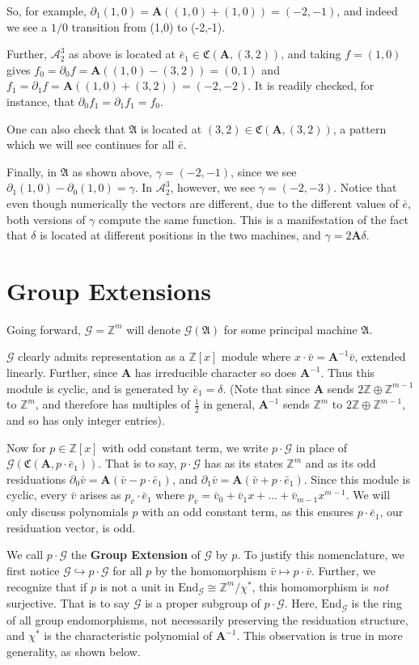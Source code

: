 \documentclass{article}
\newcommand{\A}{\mathcal{A}}
\newcommand{\G}{\mathcal{G}}
\renewcommand{\P}{\mathfrak{A}}
\newcommand{\Z}{\mathbb{Z}}
\newcommand{\2}{\textbf{2}}
\newcommand{\Am}{\textbf{A}}
\newcommand{\del}{\partial}
\newcommand{\vv}{\bar{v}}
\newcommand{\e}{\bar{e}}
\theoremstyle{definition}
\begin{document}
So, for example, $\del_1 (1,0) = \Am ((1,0) + (1,0)) = (-2,-1)$, and indeed
we see a $1/0$ transition from (1,0) to (-2,-1).

Further, $\A^3_2$ as above is located at 
$\e_1 \in \mathfrak{C}( \Am, (3,2) )$,
and taking $f = (1,0)$ gives 
$f_0 = \del_0 f = \Am((1,0) - (3,2)) = (0,1)$ and
$f_1 = \del_1 f = \Am((1,0) + (3,2)) = (-2,-2)$. It is 
readily checked, for instance, that $\del_0 f_1 = \del_1 f_1 = f_0$.

One can also check that $\P$ is located at 
$(3,2) \in \mathfrak{C}( \Am, (3,2) )$,
a pattern which we will see continues for all $\e$.

Finally, in $\P$ as shown above, $\gamma = (-2,-1)$, since
we see $\del_1 (1,0) - \del_0 (1,0) = \gamma$. In $\A^3_2$, however, 
we see $\gamma = (-2,-3)$. Notice that even though numerically the vectors 
are different, due to the different values of $\e$, both versions of 
$\gamma$ compute the same function. This is a manifestation of the fact
that $\delta$ is located at different positions in the two machines, and
$\gamma = 2 \Am \delta$.

\section{Group Extensions}
Going forward, $\G = \Z^m$ will denote $\G(\P)$ for some principal machine $\P$.

$\G$ clearly admits representation as a $\Z[x]$ module where 
$x \cdot \vv = \Am^{-1}\vv$, extended linearly. Further, since $\Am$ has 
irreducible character so does $\Am^{-1}$. Thus this module is cyclic, 
and is generated by $\e_1 = \delta$. 
(Note that since $\Am$ sends $2\Z \oplus \Z^{m-1}$ to $\Z^m$, and therefore
has multiples of $\frac{1}{2}$ in general, $\Am^{-1}$ sends $\Z^m$ to 
$2\Z \oplus \Z^{m-1}$, and so has only integer entries).

Now for $p \in \Z[x]$ with odd constant term, we write
$p \cdot \G$ in place of\\ $\G(\mathfrak{C}(\Am,p \cdot \e_1))$.
That is to say, $p \cdot \G$ has as its states $\Z^m$ and as its 
odd residuations
$\del_0 \vv = \Am (\vv - p \cdot \e_1)$, and 
$\del_1 \vv = \Am (\vv + p \cdot \e_1)$.
Since this module is cyclic, every $\vv$ arises as 
$p_{\vv} \cdot \e_1$ where 
$p_{\vv} = \vv_0 + \vv_1 x + \ldots + \vv_{m-1} x^{m-1}$.
We will only discuss polynomials $p$ with an odd constant term, as 
this ensures $p \cdot \e_1$, our residuation vector, is odd.

We call $p \cdot \G$ the \textbf{Group Extension} of $\G$ by $p$.
To justify this nomenclature, we first notice 
$\G \hookrightarrow p \cdot \G$ for all $p$ by the
homomorphism $\vv \mapsto p \cdot \vv$. 
Further, we recognize that if $p$ is not a unit in 
$\text{End}_{\G} \cong \Z^m / \chi^*$, this homomorphism is \emph{not} 
surjective. That is to say $\G$ is a proper subgroup of $p \cdot \G$.
Here, $\text{End}_{\G}$ is the ring of all group endomorphisms, not 
necessarily preserving the residuation structure, and $\chi^*$ is the
characteristic polynomial of $\Am^{-1}$. 
This observation is true in more generality, as shown below.
\end{document}
